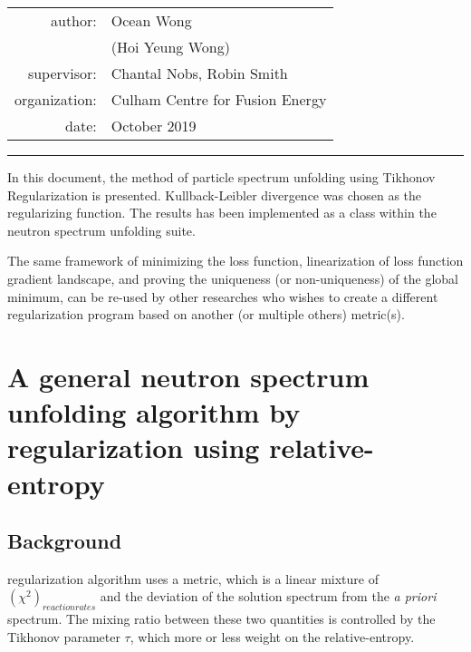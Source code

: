 \documentclass[a4paper, 12pt]{article}
\newcommand{\apriori}[0]{\textit{a priori} }
\begin{document}
    
\begin{table}[!h]
\centering
\begin{tabular}{rl}
author:&Ocean Wong          \\
       &(Hoi Yeung Wong)    \\
supervisor:&Chantal Nobs, Robin Smith    \\
organization:& Culham Centre for Fusion Energy\\
date:  &October 2019 \\
\end{tabular}
\end{table}
\hrule
\bigbreak

\abstract
In this document, the method of particle spectrum unfolding using Tikhonov Regularization is presented. Kullback-Leibler divergence was chosen as the regularizing function. The results has been implemented as a class within the neutron spectrum unfolding suite.

The same framework of minimizing the loss function, linearization of loss function gradient landscape, and proving the uniqueness (or non-uniqueness) of the global minimum, can be re-used by other researches who wishes to create a different regularization program based on another (or multiple others) metric(s).

\chapter{A general neutron spectrum unfolding algorithm by regularization using relative-entropy}
\section{Background}
  regularization algorithm uses a metric, which is a linear mixture of $(\chi^2)_{reaction rates}$ and the deviation of the solution spectrum from the \apriori spectrum. The mixing ratio between these two quantities is controlled by the Tikhonov parameter $\tau$, which more or less weight on the relative-entropy.
\end{document}

